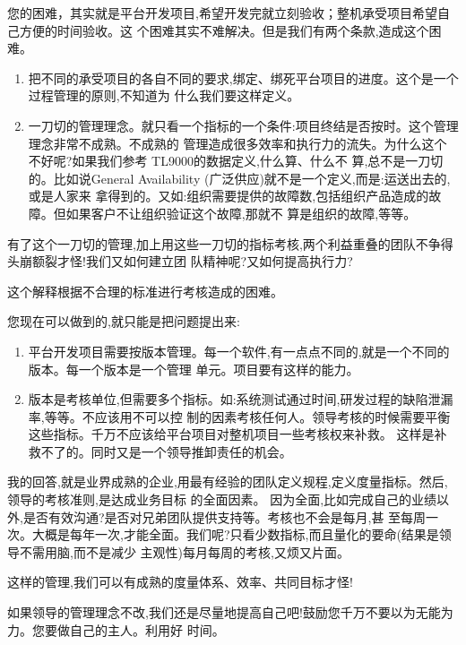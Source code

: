 \documentclass[11pt]{article}
\begin{document}
\begin{yang}
\ylogo 您的困难，其实就是平台开发项目,希望开发完就立刻验收；整机承受项目希望自己方便的时间验收。这
  个困难其实不难解决。但是我们有两个条款,造成这个困难。

  \begin{enumerate}
  \item 把不同的承受项目的各自不同的要求,绑定、绑死平台项目的进度。这个是一个过程管理的原则,不知道为
    什么我们要这样定义。

  \item 一刀切的管理理念。就只看一个指标的一个条件:项目终结是否按时。这个管理理念非常不成熟。不成熟的
    管理造成很多效率和执行力的流失。为什么这个不好呢?如果我们参考 TL9000的数据定义,什么算、什么不
    算,总不是一刀切的。比如说General Availability (广泛供应)就不是一个定义,而是:运送出去的,或是人家来
    拿得到的。又如:组织需要提供的故障数,包括组织产品造成的故障。但如果客户不让组织验证这个故障,那就不
    算是组织的故障,等等。
\end{enumerate}

有了这个一刀切的管理,加上用这些一刀切的指标考核,两个利益重叠的团队不争得头崩额裂才怪!我们又如何建立团
队精神呢?又如何提高执行力?

这个解释根据不合理的标准进行考核造成的困难。

您现在可以做到的,就只能是把问题提出来:
\begin{enumerate}
\item 平台开发项目需要按版本管理。每一个软件,有一点点不同的,就是一个不同的版本。每一个版本是一个管理
  单元。项目要有这样的能力。

\item 版本是考核单位,但需要多个指标。如:系统测试通过时间,研发过程的缺陷泄漏率,等等。不应该用不可以控
  制的因素考核任何人。领导考核的时候需要平衡这些指标。千万不应该给平台项目对整机项目一些考核权来补救。
  这样是补救不了的。同时又是一个领导推卸责任的机会。
\end{enumerate}

我的回答,就是业界成熟的企业,用最有经验的团队定义规程,定义度量指标。然后,领导的考核准则,是达成业务目标
的全面因素。 因为全面,比如完成自己的业绩以外,是否有效沟通?是否对兄弟团队提供支持等。考核也不会是每月,甚
至每周一次。大概是每年一次,才能全面。我们呢?只看少数指标,而且量化的要命(结果是领导不需用脑,而不是减少
主观性)每月每周的考核,又烦又片面。

这样的管理,我们可以有成熟的度量体系、效率、共同目标才怪!

如果领导的管理理念不改,我们还是尽量地提高自己吧!鼓励您千万不要以为无能为力。您要做自己的主人。利用好
时间。
\end{yang}
\end{document}
